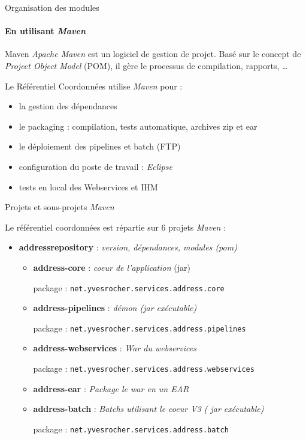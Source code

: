 \documentclass[compact]{beamer}%
\begin{document}
\begin{frame}{Organisation des modules}
	\framesubtitle{En utilisant \emph{Maven}}
	
	\begin{block}{Maven}
	\emph{Apache Maven} est un logiciel de gestion de projet. Basé sur le concept de \emph{Project Object Model} (POM), il gère le processus de compilation, rapports, \dots
	\end{block}
	
	\pause
	Le Référentiel Coordonnées utilise \emph{Maven} pour : 
	\begin{itemize}
	\item la gestion des dépendances
	\item le packaging : compilation, tests automatique, archives zip et ear
	\item le déploiement des pipelines et batch (FTP)
	\item configuration du poste de travail : \emph{Eclipse}
	\item tests en local des Webservices et IHM
	\end{itemize}

\end{frame}

\begin{frame}{Projets et sous-projets \emph{Maven}}
	
	Le référentiel coordonnées est répartie sur 6 projets \emph{Maven} :
	\begin{itemize}[<+->]
	\item \textbf{addressrepository} : \emph{version, dépendances, modules (pom)} 
		\begin{itemize}
		\item \textbf{address-core} : \emph{coeur de l'application} (jar)\par
		package : \texttt{net.yvesrocher.services.address.core}
		\item \textbf{address-pipelines} : \emph{démon (jar exécutable)}\par
		package : \texttt{net.yvesrocher.services.address.pipelines}
		\item \textbf{address-webservices} : \emph{War du webservices}\par
		package : \texttt{net.yvesrocher.services.address.webservices}
		\item \textbf{address-ear} : \emph{Package le war en un EAR}
		\item \textbf{address-batch} : \emph{Batchs utilisant le coeur V3 ( jar exécutable)}\par
		package : \texttt{net.yvesrocher.services.address.batch}
		\end{itemize}
	\end{itemize}

\end{frame}
\end{document}

